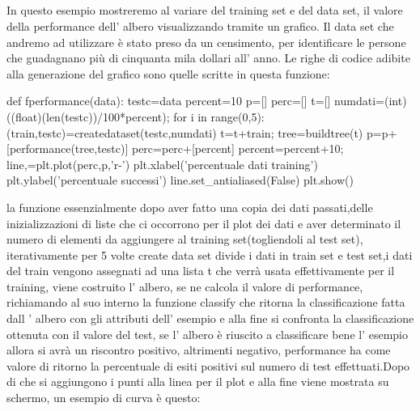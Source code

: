 		\subsection{}
		In questo esempio mostreremo al variare del training set e del data set, il valore della performance dell' albero visualizzando tramite un grafico.
		Il data set che andremo ad utilizzare è stato preso da un censimento, per identificare le persone che guadagnano più di cinquanta mila dollari all' anno.
		Le righe di codice adibite alla generazione del grafico sono quelle scritte in questa funzione:
		\begin{python}
		def fperformance(data):
			testc=data
			percent=10
			p=[]
			perc=[]
			t=[]
			numdati=(int)((float)(len(testc))/100*percent);
			for i in range(0,5):
				(train,testc)=createdataset(testc,numdati)
				t=t+train;
				tree=buildtree(t)
				p=p+[performance(tree,testc)]
				perc=perc+[percent]
				percent=percent+10;
				line,=plt.plot(perc,p,'r-')
			plt.xlabel('percentuale dati training')
			plt.ylabel('percentuale successi')
			line.set_antialiased(False)
			plt.show()
		\end{python}
		la funzione essenzialmente dopo aver fatto una copia dei dati passati,delle inizializzazioni di liste che ci occorrono per il plot dei dati e aver determinato il numero di elementi da aggiungere al training set(togliendoli al test set), iterativamente per 5 volte create data set divide i dati in train set e test set,i dati del train vengono assegnati ad una lista t che verrà usata effettivamente per il training, viene costruito l' albero, se ne calcola il valore di performance, richiamando al suo interno la funzione classify che ritorna la classificazione fatta dall ' albero con gli attributi dell' esempio e alla fine si confronta la classificazione ottenuta con il valore del test, se l' albero è riuscito a classificare bene l' esempio allora si avrà un riscontro positivo, altrimenti negativo, performance  ha come valore di ritorno la percentuale di esiti positivi sul numero di test effettuati.Dopo di che si aggiungono i punti alla linea per il plot e alla fine viene mostrata su schermo, un esempio di curva è questo:
